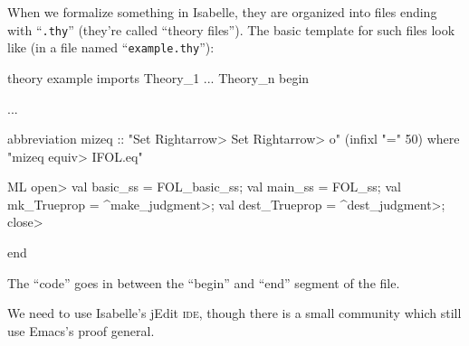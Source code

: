 \begin{node}\label{isabelle-0004}%
When we formalize something in Isabelle, they are organized into files
ending with ``\texttt{.thy}'' (they're called ``theory files''). The
basic template for such files look like (in a file named ``\texttt{example.thy}''):
\begin{Isabelle}
theory example
imports Theory_1 ... Theory\_n
begin

...

abbreviation mizeq :: "Set \<Rightarrow> Set \<Rightarrow> o" (infixl "=" 50)
  where "mizeq \<equiv> IFOL.eq"


ML \<open>
val basic_ss = FOL_basic_ss;
val main_ss = FOL_ss;
val mk_Trueprop = \<^make_judgment>;
val dest_Trueprop = \<^dest_judgment>;
\<close>
  
end
\end{Isabelle}
The ``code'' goes in between the ``begin'' and ``end'' segment of the file.

We need to use Isabelle's jEdit \textsc{ide}, though there is a small
community which still use Emacs's proof general.
\end{node}

